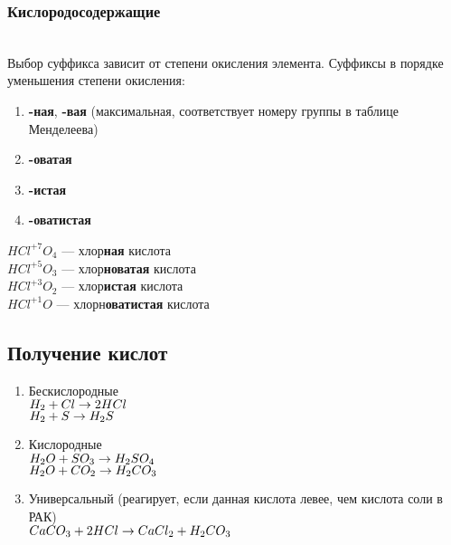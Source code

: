 \subsubsection{Кислородосодержащие}
\\
Выбор суффикса зависит от степени окисления элемента.
Суффиксы в порядке уменьшения степени окисления:
\begin{enumerate}
    \item \textbf{-ная}, \textbf{-вая} (максимальная, соответствует номеру
                                        группы в таблице Менделеева)
    \item \textbf{-оватая}
    \item \textbf{-истая}
    \item \textbf{-оватистая}
\end{enumerate}
$HCl^{+7}O_4$ --- хлор\textbf{ная} кислота\\
$HCl^{+5}O_3$ --- хлор\textbf{новатая} кислота\\
$HCl^{+3}O_2$ --- хлор\textbf{истая} кислота\\
$HCl^{+1}O$   --- хлорн\textbf{оватистая} кислота\\



\subsection{Получение кислот}
\begin{enumerate}
    \item Бескислородные\\
        $H_2 + Cl \rightarrow 2HCl$\\
        $H_2 + S \rightarrow H_2S$

    \item Кислородные\\
        $H_2O + SO_3 \rightarrow H_2SO_4$\\
        $H_2O + CO_2 \rightarrow H_2CO_3$

    \item Универсальный (реагирует, если данная кислота левее, чем кислота соли в РАК)\\
        $CaCO_3 + 2HCl \rightarrow CaCl_2 + H_2CO_3$

\end{enumerate}


